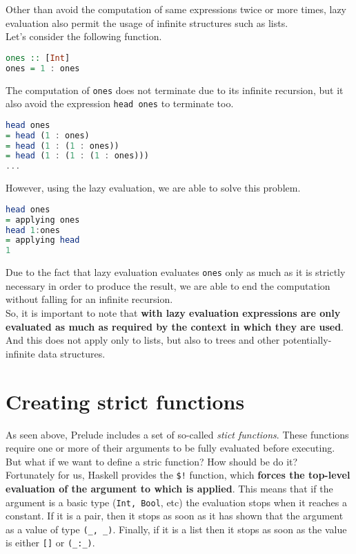 Other than avoid the computation of same expressions twice or more times, lazy evaluation also permit the usage of infinite structures such as lists. \\
Let's consider the following function. 

\begin{lstlisting}[language=haskell]
ones :: [Int]
ones = 1 : ones
\end{lstlisting}

The computation of \texttt{ones} does not terminate due to its infinite recursion, but it also avoid the expression \texttt{head ones} to terminate too.

\begin{lstlisting}[language=haskell]
head ones
= head (1 : ones)
= head (1 : (1 : ones))
= head (1 : (1 : (1 : ones)))
...
\end{lstlisting}

However, using the lazy evaluation, we are able to solve this problem.

\begin{lstlisting}[language=haskell]
head ones
= applying ones
head 1:ones
= applying head
1
\end{lstlisting}

Due to the fact that lazy evaluation evaluates \texttt{ones} only as much as it is strictly necessary in order to produce the result, we are able to end the computation without falling for an infinite recursion. \\
So, it is important to note that \textbf{with lazy evaluation expressions are only evaluated as much as required by the context in which they are used}. And this does not apply only to lists, but also to trees and other potentially-infinite data structures.

\section{Creating strict functions}
As seen above, Prelude includes a set of so-called \textit{stict functions}. These functions require one or more of their arguments to be fully evaluated before executing. But what if we want to define a stric function? How should be do it? \\
Fortunately for us, Haskell provides the \texttt{\$!} function, which \textbf{forces the top-level evaluation of the argument to which is applied}. 
This means that if the argument is a basic type (\texttt{Int, Bool}, etc) the evaluation stops when it reaches a constant. If it is a pair, then it stops as soon as it has shown that the argument as a value of type \texttt{(\_, \_)}. Finally, if it is a list then it stops as soon as the value is either \texttt{[]} or \texttt{(\_:\_)}.
\linebreak \linebreak

